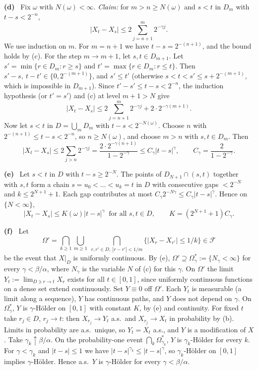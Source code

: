 \documentclass[11pt,a4paper]{article}
\newcommand{\F}{\mathcal{F}}
\newcommand{\1}{\mathbf{1}}
\newcommand{\sub}[1]{\par\smallskip\noindent\textbf{#1}\ }
\begin{document}
\sub{(d)} Fix $\omega$ with $N(\omega)<\infty$.
\emph{Claim:} for $m>n\ge N(\omega)$ and $s<t$ in $D_m$ with $t-s<2^{-n}$,
\[|X_t-X_s|\le2\sum_{j=n+1}^m2^{-\gamma j}.\]
We use induction on $m$. For $m=n+1$ we have $t-s=2^{-(n+1)}$, and the bound holds by (c). For the step
$m\to m+1$, let $s,t\in D_{m+1}$. Let $s'=\min\{r\in D_m:r\ge s\}$ and $t'=\max\{r\in D_m:r\le t\}$. Then
$s'-s,\ t-t'\in\{0,2^{-(m+1)}\}$, and $s'\le t'$ (otherwise $s<t<s'\le s+2^{-(m+1)}$, which is
impossible in $D_{m+1}$). Since $t'-s'\le t-s<2^{-n}$, the induction hypothesis (or $t'=s'$) and
(c) at level $m+1>N$ give
\[|X_t-X_s|\le 2\sum_{j=n+1}^m2^{-\gamma j}+2\cdot2^{-\gamma(m+1)}.\]
Now let $s<t$ in $D=\bigcup_mD_m$ with $t-s<2^{-N(\omega)}$. Choose $n$ with
$2^{-(n+1)}\le t-s<2^{-n}$, so $n\ge N(\omega)$, and choose $m>n$ with $s,t\in D_m$. Then
\[
|X_t-X_s|\le 2\sum_{j>n}2^{-\gamma j}=\frac{2\cdot2^{-\gamma(n+1)}}{1-2^{-\gamma}}\le C_\gamma|t-s|^\gamma,
\qquad C_\gamma=\frac{2}{1-2^{-\gamma}}.
\]

\sub{(e)} Let $s<t$ in $D$ with $t-s\ge2^{-N}$. The points of $D_{N+1}\cap(s,t)$ together with $s,t$
form a chain $s=u_0<\dots<u_k=t$ in $D$ with consecutive gaps $<2^{-N}$ and $k\le2^{N+1}+1$.
Each gap contributes at most $C_\gamma2^{-N\gamma}\le C_\gamma|t-s|^\gamma$. Hence on $\{N<\infty\}$,
\[|X_t-X_s|\le K(\omega)|t-s|^\gamma\ \text{ for all } s,t\in D,\qquad K=(2^{N+1}+1)C_\gamma.\]

\sub{(f)} Let
\[\Omega'=\bigcap_{k\ge1}\bigcup_{m\ge1}\ \bigcap_{r,r'\in D,\ |r-r'|<1/m}\{|X_r-X_{r'}|\le1/k\}\in\F\]
be the event that $X|_D$ is uniformly continuous. By (e), $\Omega'\supseteq\Omega^*_\gamma:=\{N_\gamma<\infty\}$ for
every $\gamma<\beta/\alpha$, where $N_\gamma$ is the variable $N$ of (c) for this $\gamma$. On $\Omega'$ the limit
$Y_t:=\lim_{D\ni r\to t}X_r$ exists for all $t\in[0,1]$, since uniformly continuous functions on a dense set extend
continuously. Set $Y\equiv0$ off $\Omega'$. Each $Y_t$ is measurable (a limit along a sequence), $Y$ has continuous
paths, and $Y$ does not depend on $\gamma$. On $\Omega^*_\gamma$, $Y$ is $\gamma$-H\"older on $[0,1]$ with constant $K$,
by (e) and continuity. For fixed $t$ take $r_j\in D$, $r_j\to t$: then $X_{r_j}\to Y_t$ a.s.\ and
$X_{r_j}\to X_t$ in probability by (b). Limits in probability are a.s.\ unique, so $Y_t=X_t$ a.s.,
and $Y$ is a modification of $X$. Take $\gamma_k\uparrow\beta/\alpha$. On the probability-one event
$\bigcap_k\Omega^*_{\gamma_k}$, $Y$ is $\gamma_k$-H\"older for every $k$. For $\gamma<\gamma_k$ and $|t-s|\le1$ we have
$|t-s|^{\gamma_k}\le|t-s|^{\gamma}$, so $\gamma_k$-H\"older on $[0,1]$ implies $\gamma$-H\"older. Hence a.s.\ $Y$ is
$\gamma$-H\"older for every $\gamma<\beta/\alpha$.
\end{document}
